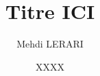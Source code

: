 \documentclass[a4paper, 12pt, oneside,openright]{report}
\author{Mehdi \scshape{LERARI}}
\title{Titre ICI}
\date{XXXX}
\begin{document}
	\pagedegarde 
	
\end{document}
